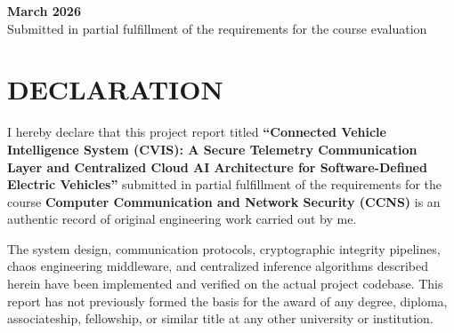 \documentclass[12pt,a4paper]{report}
\begin{document}
\begin{titlepage}
    \begin{figure}[H]
        \centering
    \end{figure}
    
    \vfill
    {\large\textbf{March 2026}}\\[0.2cm]
    {\small Submitted in partial fulfillment of the requirements for the course evaluation}
\end{titlepage}

\setcounter{page}{2}

\chapter*{DECLARATION}

I hereby declare that this project report titled \textbf{``Connected Vehicle Intelligence System (CVIS): A Secure Telemetry Communication Layer and Centralized Cloud AI Architecture for Software-Defined Electric Vehicles''} submitted in partial fulfillment of the requirements for the course \textbf{Computer Communication and Network Security (CCNS)} is an authentic record of original engineering work carried out by me.

The system design, communication protocols, cryptographic integrity pipelines, chaos engineering middleware, and centralized inference algorithms described herein have been implemented and verified on the actual project codebase. This report has not previously formed the basis for the award of any degree, diploma, associateship, fellowship, or similar title at any other university or institution.
\end{document}
